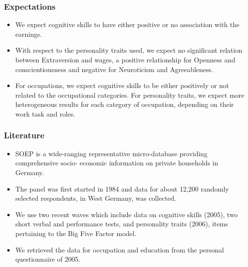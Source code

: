 \documentclass[11pt]{beamer}
\begin{document}
\begin{frame}[t]
     \note{~}
\end{frame}


\begin{frame}[t]
	\frametitle{Expectations}
	\begin{itemize}
		\item We expect cognitive skills to have either positive or no association
with the earnings.
		\item With respect to the personality traits used, we expect no significant
relation between Extraversion and wages, a positive relationship for
Openness and conscientiousness and negative for Neuroticism and
Agreeableness.

		\item For occupations, we expect cognitive skills to be either positively or
not related to the occupational categories. For personality traits, we
expect more heterogeneous results for each category of occupation,
depending on their work task and roles.
	 \end{itemize}
 	\note{~}
\end{frame}

\begin{frame}[t]
	\frametitle{Literature}
         \begin{itemize}

 
		 \item SOEP is a wide-ranging representative micro-database providing
comprehensive socio- economic information on private households in
Germany.

		\item The panel was first started in 1984 and data for about 12,200
randomly selected respondents, in West Germany, was collected.

		\item We use two recent waves which include data on cognitive skills
(2005), two short verbal and performance tests, and personality traits
(2006), items pertaining to the Big Five Factor model.

		\item We retrieved the data for occupation and education from the
personal questionnaire of 2005.
	\end{itemize}
	\note{~}
\end{frame}
\end{document}
